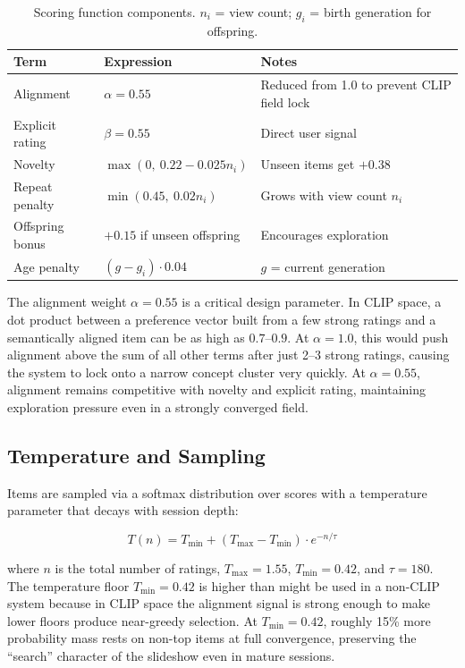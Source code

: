 \documentclass[12pt, a4paper]{article}
\begin{document}
\begin{table}[H]
\centering
\begin{tabular}{lll}
\toprule
\textbf{Term} & \textbf{Expression} & \textbf{Notes} \\
\midrule
Alignment & $\alpha = 0.55$ & Reduced from 1.0 to prevent CLIP field lock \\
Explicit rating & $\beta = 0.55$ & Direct user signal \\
Novelty & $\max(0,\ 0.22 - 0.025 n_i)$ & Unseen items get $+0.38$ \\
Repeat penalty & $\min(0.45,\ 0.02 n_i)$ & Grows with view count $n_i$ \\
Offspring bonus & $+0.15$ if unseen offspring & Encourages exploration \\
Age penalty & $(g - g_i) \cdot 0.04$ & $g$ = current generation \\
\bottomrule
\end{tabular}
\caption{Scoring function components. $n_i$ = view count; $g_i$ = birth generation for offspring.}
\end{table}

The alignment weight $\alpha = 0.55$ is a critical design parameter. In CLIP space, a dot product between a preference vector built from a few strong ratings and a semantically aligned item can be as high as $0.7$--$0.9$. At $\alpha = 1.0$, this would push alignment above the sum of all other terms after just 2--3 strong ratings, causing the system to lock onto a narrow concept cluster very quickly. At $\alpha = 0.55$, alignment remains competitive with novelty and explicit rating, maintaining exploration pressure even in a strongly converged field.

\subsection{Temperature and Sampling}

Items are sampled via a softmax distribution over scores with a temperature parameter that decays with session depth:

\begin{equation}
T(n) = T_{\min} + (T_{\max} - T_{\min}) \cdot e^{-n / \tau}
\end{equation}

where $n$ is the total number of ratings, $T_{\max} = 1.55$, $T_{\min} = 0.42$, and $\tau = 180$. The temperature floor $T_{\min} = 0.42$ is higher than might be used in a non-CLIP system because in CLIP space the alignment signal is strong enough to make lower floors produce near-greedy selection. At $T_{\min} = 0.42$, roughly 15\% more probability mass rests on non-top items at full convergence, preserving the ``search'' character of the slideshow even in mature sessions.
\end{document}
